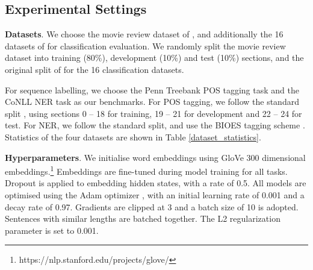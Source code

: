 \documentclass[11pt,a4paper]{article}
\begin{document}
\subsection{Experimental Settings}
{\bf Datasets}. We choose the movie review dataset of , and additionally the 16 datasets of  for classification evaluation. 
We randomly split the movie review dataset into training (80\%), development (10\%) and test (10\%) sections, and the original split of  for the 16 classification datasets. 


For sequence labelling, we choose the Penn Treebank \cite{marcus1993building} POS tagging task and the CoNLL \cite{tjong2003introduction} NER task as our benchmarks. 
For POS tagging, we follow the standard split \cite{manning2011part}, using sections 0 -- 18 for training, 19 -- 21 for development and 22 -- 24 for test. 
For NER, we follow the standard split, and use the BIOES tagging scheme \cite{ratinov2009design}. 
Statistics of the four datasets are shown in Table \ref{dataset_statistics}. 


{\bf Hyperparameters}. We initialise word embeddings using GloVe \cite{pennington2014glove} 300 dimensional embeddings.\footnote{https://nlp.stanford.edu/projects/glove/}
Embeddings are fine-tuned during model training for all tasks. 
Dropout \cite{srivastava2014dropout} is applied to embedding hidden states, with a rate of 0.5. 
All models are optimised using the Adam optimizer \cite{kingma2014adam}, with an initial learning rate of 0.001 and a decay rate of 0.97. Gradients are clipped at 3 and a batch size of 10 is adopted. 
Sentences with similar lengths are batched together.
The L2 regularization parameter is set to 0.001.
\end{document}
